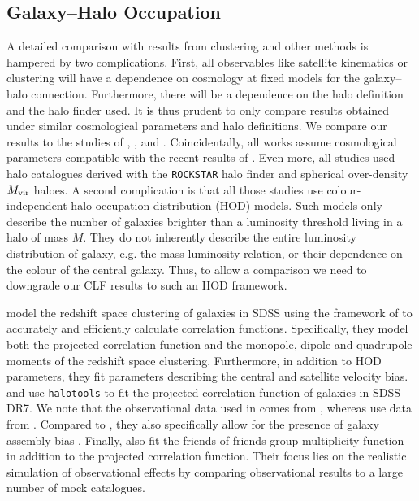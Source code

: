 \documentclass[fleqn,usenatbib,useAMS]{mnras}
\begin{document}
\subsection{Galaxy--Halo Occupation}

A detailed comparison with results from clustering and other methods is hampered by two complications. First, all observables like satellite kinematics or clustering will have a dependence on cosmology at fixed models for the galaxy--halo connection. Furthermore, there will be a dependence on the halo definition and the halo finder used. It is thus prudent to only compare results obtained under similar cosmological parameters and halo definitions. We compare our results to the studies of \cite{Guo+15b}, \cite{Zentner+16}, \cite{Vakili+16} and \cite{Sinha+17}. Coincidentally, all works assume cosmological parameters compatible with the recent results of \cite{Planck14}. Even more, all studies used halo catalogues derived with the \texttt{ROCKSTAR} halo finder \citep{Behroozi+13} and spherical over-density $M_{\rm vir}$ haloes. A second complication is that all those studies use colour-independent halo occupation distribution (HOD) models. Such models only describe the number of galaxies brighter than a luminosity threshold living in a halo of mass $M$. They do not inherently describe the entire luminosity distribution of galaxy, e.g. the mass-luminosity relation, or their dependence on the colour of the central galaxy. Thus, to allow a comparison we need to downgrade our CLF results to such an HOD framework.

\cite{Guo+15b} model the redshift space clustering of galaxies in SDSS using the framework of \cite{Zheng+16} to accurately and efficiently calculate correlation functions. Specifically, they model both the projected correlation function and the monopole, dipole and quadrupole moments of the redshift space clustering. Furthermore, in addition to HOD parameters, they fit parameters describing the central and satellite velocity bias. \cite{Zentner+16} and \cite{Vakili+16} use \texttt{halotools} \citep{Hearin+16} to fit the projected correlation function of galaxies in SDSS DR7. We note that the observational data used in \cite{Zentner+16} comes from \cite{Zehavi+11}, whereas \cite{Vakili+16} use data from \cite{Guo+15b}. Compared to \cite{Guo+15b}, they also specifically allow for the presence of galaxy assembly bias \citep{Zentner+14}. Finally, \cite{Sinha+17} also fit the friends-of-friends group multiplicity function in addition to the projected correlation function. Their focus lies on the realistic simulation of observational effects by comparing observational results to a large number of mock catalogues.
\end{document}
